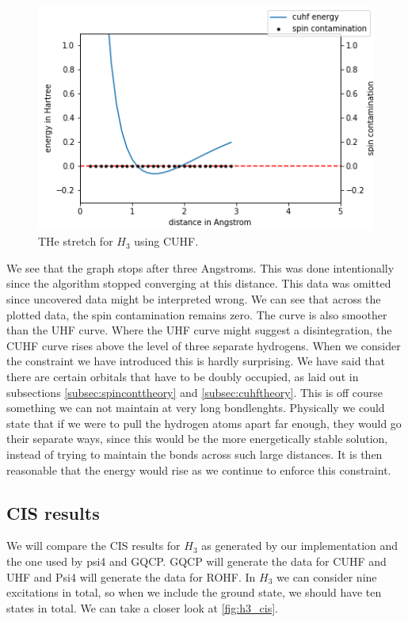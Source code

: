 \documentclass[twoside,twocolumn,9pt]{article}
\begin{document}
\begin{center}
  \begin{figure}[h]
    \includegraphics[width=\linewidth]{./../notes/figures/cuhf_mix_h3.png}
    \caption{THe stretch for $H_3$ using CUHF.}
    \label{fig:cuhf_h3}
  \end{figure}
\end{center}
We see that the graph stops after three Angstroms. This was done intentionally since the algorithm stopped converging at this distance. This data was omitted since 
uncovered data might be interpreted wrong. We can see that across the plotted data, the spin contamination remains zero. The curve is also smoother than the UHF curve. Where 
the UHF curve might suggest a disintegration, the CUHF curve rises above the level of three separate hydrogens. When we consider the constraint we have introduced this is hardly
surprising. We have said that there are certain orbitals that have to be doubly occupied, as laid out in subsections \ref{subsec:spinconttheory} and \ref{subsec:cuhftheory}.
This is off course something we can not maintain at very long bondlenghts. Physically we could state that if we were to pull the hydrogen atoms apart far enough, they would go 
their separate ways, since this would be the more energetically stable solution, instead of trying to maintain the bonds across such large distances. It is then reasonable that
the energy would rise as we continue to enforce this constraint.

\subsection{CIS results}
\label{subsec:cis}
We will compare the CIS results for $H_3$ as generated by our implementation and the one used by psi4 and GQCP. GQCP will generate the data for CUHF and UHF and Psi4 will generate
the data for ROHF. In $H_3$ we can consider nine excitations in total, so when we include the ground state, we should have ten states in total. We can take a closer look at
\ref{fig:h3_cis}.
\end{document}
